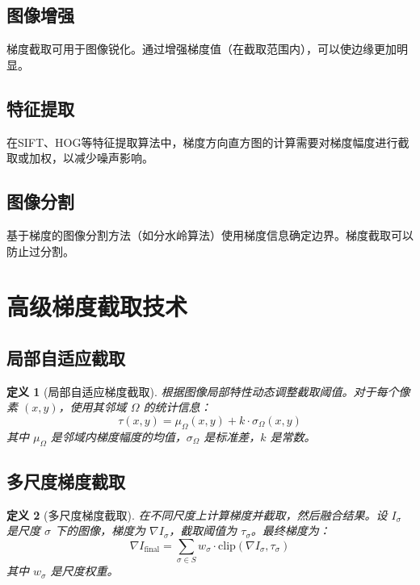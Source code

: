 \documentclass{article}
\newtheorem{definition}{定义}[section]
\begin{document}
\subsection{图像增强}

梯度截取可用于图像锐化。通过增强梯度值（在截取范围内），可以使边缘更加明显。

\subsection{特征提取}

在SIFT、HOG等特征提取算法中，梯度方向直方图的计算需要对梯度幅度进行截取或加权，以减少噪声影响。

\subsection{图像分割}

基于梯度的图像分割方法（如分水岭算法）使用梯度信息确定边界。梯度截取可以防止过分割。

\section{高级梯度截取技术}

\subsection{局部自适应截取}

\begin{definition}[局部自适应梯度截取]
根据图像局部特性动态调整截取阈值。对于每个像素 $(x,y)$，使用其邻域 $\Omega$ 的统计信息：
\[
\tau(x,y) = \mu_\Omega(x,y) + k \cdot \sigma_\Omega(x,y)
\]
其中 $\mu_\Omega$ 是邻域内梯度幅度的均值，$\sigma_\Omega$ 是标准差，$k$ 是常数。
\end{definition}

\subsection{多尺度梯度截取}

\begin{definition}[多尺度梯度截取]
在不同尺度上计算梯度并截取，然后融合结果。设 $I_\sigma$ 是尺度 $\sigma$ 下的图像，梯度为 $\nabla I_\sigma$，截取阈值为 $\tau_\sigma$。最终梯度为：
\[
\nabla I_{\text{final}} = \sum_{\sigma \in S} w_\sigma \cdot \text{clip}(\nabla I_\sigma, \tau_\sigma)
\]
其中 $w_\sigma$ 是尺度权重。
\end{definition}
\end{document}

